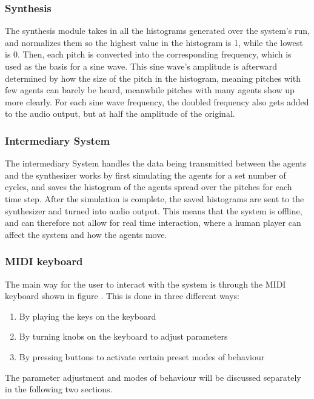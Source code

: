 \documentclass[a4paper,english]{report}
\begin{document}
	\subsubsection{Synthesis}
	The synthesis module takes in all the histograms generated over the system's run, and normalizes them so the highest value in the histogram is 1, while the lowest is 0. Then, each pitch is converted into the corresponding frequency, which is used as the basis for a sine wave. This sine wave's amplitude is afterward determined by how the size of the pitch in the histogram, meaning pitches with few agents can barely be heard, meanwhile pitches with many agents show up more clearly. For each sine wave frequency, the doubled frequency also gets added to the audio output, but at half the amplitude of the original.
	
	\subsubsection{Intermediary System}
	The intermediary System handles the data being transmitted between the agents and the synthesizer works by first simulating the agents for a set number of cycles, and saves the histogram of the agents spread over the pitches for each time step. After the simulation is complete, the saved histograms are sent to the synthesizer and turned into audio output. This means that the system is offline, and can therefore not allow for real time interaction, where a human player can affect the system and how the agents move.
	
	\subsubsection{MIDI keyboard}
	The main way for the user to interact with the system is through the MIDI keyboard shown in figure . This is done in three different ways:
	\begin{samepage}\begin{enumerate}
		\item By playing the keys on the keyboard
		\item By turning knobs on the keyboard to adjust parameters
		\item By pressing buttons to activate certain preset modes of behaviour
	\end{enumerate}\end{samepage}
	The parameter adjustment and modes of behaviour will be discussed separately in the following two sections.
	
\end{document}
